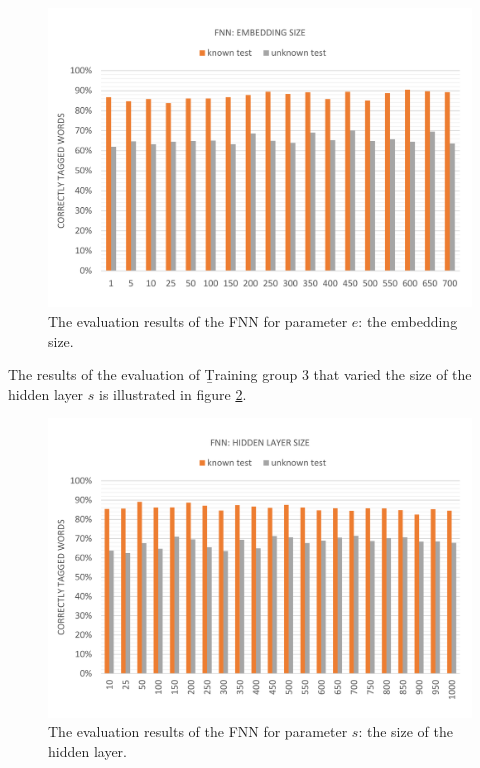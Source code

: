 \begin{figure}[H]
	\hspace{-5mm}\includegraphics[width=1.07\textwidth]{images/evaluation_fnn_e}
	\caption[FNN Evaluation: Number of Past Words]{The evaluation results of the FNN for parameter $e$: the embedding size.}
	\label{f.evaluation.fnn.e}
\end{figure}

The results of the evaluation of \b{Training group 3} that varied the size of the hidden layer $s$ is illustrated in figure \ref{f.evaluation.fnn.s}.

\begin{figure}[H]
	\hspace{-5mm}\includegraphics[width=1.07\textwidth]{images/evaluation_fnn_s}
	\caption[FNN Evaluation: Hidden Layer Size]{The evaluation results of the FNN for parameter $s$: the size of the hidden layer.}
	\label{f.evaluation.fnn.s}
\end{figure}

